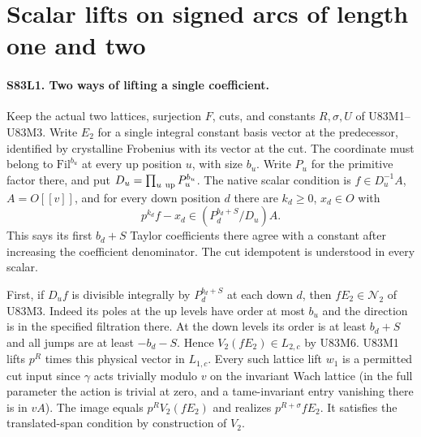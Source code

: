 \section{Scalar lifts on signed arcs of length one and two}

\paragraph{S83L1. Two ways of lifting a single coefficient.}
Keep the actual two lattices, surjection $F$, cuts, and constants
$R,\sigma,U$ of U83M1--U83M3. Write $E_2$ for a single integral
constant basis vector at the predecessor, identified by crystalline
Frobenius with its vector at the cut. The coordinate must belong to
$\mathrm{Fil}^{b_u}$ at every up position $u$, with size $b_u$.
Write $P_u$ for the primitive factor there, and put
$D_u=\prod_{u\ {\rm up}}P_u^{b_u}$. The native scalar condition
is $f\in D_u^{-1}A$, $A=O[[v]]$, and for every down position $d$
there are $k_d\ge0$, $x_d\in O$ with
\[
      p^{k_d} f-x_d\in (P_d^{b_d+S}/D_u)A .
\]
This says its first $b_d+S$ Taylor coefficients there agree with a
constant after increasing the coefficient denominator. The cut
idempotent is understood in every scalar.

First, if $D_u f$ is divisible integrally by $P_d^{b_d+S}$ at
each down $d$, then $fE_2\in\mathcal N_2$ of U83M3. Indeed its poles
at the up levels have order at most $b_u$ and the direction is
in the specified filtration there. At the down levels its order is
at least $b_d+S$ and all jumps are at least $-b_d-S$. Hence
$V_2(fE_2)\in L_{2,c}$ by U83M6. U83M1 lifts $p^R$ times this
physical vector in $L_{1,c}$. Every such lattice lift $w_1$ is a
permitted cut input since $\gamma$ acts trivially modulo $v$ on the
invariant Wach lattice (in the full parameter the action is trivial
at zero, and a tame-invariant entry vanishing there is in $vA$).
The image equals $p^R V_2(fE_2)$ and realizes $p^{R+\sigma}f E_2$.
It satisfies the translated-span condition by construction of $V_2$.

